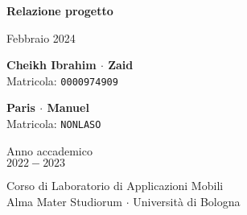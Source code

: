 \documentclass[11pt]{article}
\begin{document}
\begin{titlepage}
    \begin{center}
        \vspace*{1.5cm}
            
        \Huge
        \textbf{Relazione progetto}
            
        \vspace{0.3cm}
        \LARGE
        Febbraio 2024

        \vspace{1.5cm}
          
        \begin{minipage}[t]{0.47\textwidth}
            \begin{center}
                {\large{\bf Cheikh Ibrahim $\cdot$ Zaid}}\\
                {\large Matricola: \texttt{0000974909}}
            \end{center}
    
            \end{minipage}
            \hfill
            \begin{minipage}[t]{0.47\textwidth}\raggedleft
            \begin{center}
                {\large{\bf Paris $\cdot$ Manuel}}\\
                {\large Matricola: \texttt{NONLASO}}
            \end{center}
        \end{minipage}
            
        \vspace{6cm}
            
        Anno accademico\\
        $2022 - 2023$
            
        \vspace{0.8cm}
            
            
        \Large
        Corso di Laboratorio di Applicazioni Mobili\\
        Alma Mater Studiorum $\cdot$ Università di Bologna\\
            
    \end{center}
\end{titlepage}
\pagebreak
\end{document}
